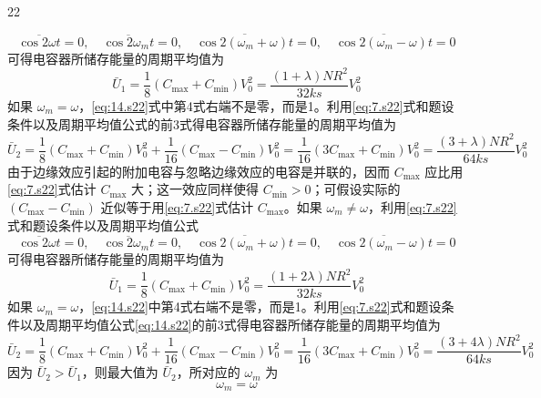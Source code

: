 \begin{solution}{22}
\begin{subsolution}
\begin{equation}
            \overline{\cos 2\omega t} = 0, \quad \overline{\cos 2\omega_m t} = 0, \quad \overline{\cos 2(\omega_m + \omega)t} = 0, \quad \overline{\cos 2(\omega_m - \omega)t} = 0
            \label{eq:14.s22}
        \end{equation}
        可得电容器所储存能量的周期平均值为
        \begin{equation}
            \bar{U}_1 = \frac{1}{8}(C_{\max} + C_{\min})V_0^2 = \frac{(1 + \lambda)N R^2}{32 k s}V_0^2
            \label{eq:15.s22}
        \end{equation}
        如果 $\omega_m = \omega$，\eqref{eq:14.s22}式中第4式右端不是零，而是1。利用\eqref{eq:7.s22}式和题设条件以及周期平均值公式的前3式得电容器所储存能量的周期平均值为
        \begin{equation}
            \bar{U}_2 = \frac{1}{8}(C_{\max} + C_{\min})V_0^2 + \frac{1}{16}(C_{\max} - C_{\min})V_0^2 = \frac{1}{16}(3C_{\max} + C_{\min})V_0^2 = \frac{(3 + \lambda)N R^2}{64 k s}V_0^2
            \label{eq:16.s22}
        \end{equation}
        由于边缘效应引起的附加电容与忽略边缘效应的电容是并联的，因而 $C_{\max}$ 应比用\eqref{eq:7.s22}式估计 $C_{\max}$ 大；这一效应同样使得 $C_{\min} > 0$；可假设实际的 $(C_{\max} - C_{\min})$ 近似等于用\eqref{eq:7.s22}式估计 $C_{\max}$。如果 $\omega_m \neq \omega$，利用\eqref{eq:7.s22}式和题设条件以及周期平均值公式
        \begin{equation}
            \overline{\cos 2\omega t} = 0, \quad \overline{\cos 2\omega_m t} = 0, \quad \overline{\cos 2(\omega_m + \omega)t} = 0, \quad \overline{\cos 2(\omega_m - \omega)t} = 0
            \label{eq:17.s22}
        \end{equation}
        可得电容器所储存能量的周期平均值为
        \begin{equation}
            \bar{U}_1 = \frac{1}{8}(C_{\max} + C_{\min})V_0^2 = \frac{(1 + 2\lambda)N R^2}{32 k s}V_0^2
            \label{eq:18.s22}
        \end{equation}
        如果 $\omega_m = \omega$，\eqref{eq:14.s22}中第4式右端不是零，而是1。利用\eqref{eq:7.s22}式和题设条件以及周期平均值公式\eqref{eq:14.s22}的前3式得电容器所储存能量的周期平均值为
        \begin{equation}
            \bar{U}_2 = \frac{1}{8}(C_{\max} + C_{\min})V_0^2 + \frac{1}{16}(C_{\max} - C_{\min})V_0^2 = \frac{1}{16}(3C_{\max} + C_{\min})V_0^2 = \frac{(3 + 4\lambda)N R^2}{64 k s}V_0^2
            \label{eq:19.s22}
        \end{equation}
        因为 $\bar{U}_2 > \bar{U}_1$，则最大值为 $\bar{U}_2$，所对应的 $\omega_m$ 为
        \begin{equation}
            \omega_m = \omega
            \label{eq:20.s22}
        \end{equation}
    \end{subsolution}
\end{solution}